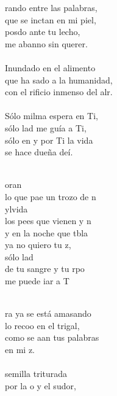 \begin{cancion}%
	rando entre las palabras,\\
	que se inctan en mi piel,\\
	posdo ante tu lecho,\\
	me abanno sin querer.\\
	\jump\\
Inundado en el alimento\\
	que ha sado a la humanidad,\\
	con el rificio inmenso del alr.\\
\jump\\
	Sólo milma espera en Ti, \\
	sólo lad me guía a Ti, \\
	sólo en y por Ti la vida \\
	se hace dueña deí. \\\jump\\
	\begin{chorus}%
	oran \\
	lo que pae un trozo de n\\
	ylvida \\
	los pees que vienen y n \\
	y en la noche que tbla \\
	ya no quiero tu z, \\
	sólo lad \\
	de tu sangre y tu rpo  \\
	me puede iar a T\\
	\end{chorus}%
	\jump\\
	ra ya se está amasando \\
	lo recoo en el trigal, \\
	como se aan tus palabras \\
	en mi z. \\
\jump\\
	 semilla triturada \\
	por la o y el sudor, \\

\end{cancion}
